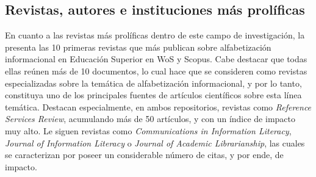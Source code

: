 \documentclass[spanish]{textolivre}
\begin{document}
\subsection{Revistas, autores e instituciones más prolíficas
}
En cuanto a las revistas más prolíficas dentro de este campo de investigación, la  presenta las 10 primeras revistas que más publican sobre alfabetización informacional en Educación Superior en WoS y Scopus. Cabe destacar que todas ellas reúnen más de 10 documentos, lo cual hace que se consideren como revistas especializadas  sobre la temática de alfabetización informacional, y por lo tanto, constituya uno de los principales fuentes de artículos científicos sobre esta línea temática. Destacan especialmente, en ambos repositorios, revistas como \emph{Reference Services Review}, acumulando más de 50 artículos, y con un índice de impacto muy alto. Le siguen revistas como \emph{Communications in Information Literacy}, \emph{Journal of Information Literacy} o \emph{Journal of Academic Librarianship}, las cuales se caracterizan por poseer un considerable número de citas, y por ende, de impacto.
\end{document}
